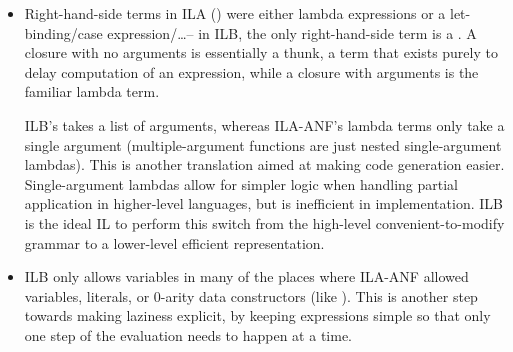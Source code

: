 \documentclass[dissertation.tex]{subfiles}
\begin{document}
{{{\begin{itemize}
{                 also requires all its arguments to be present: it cannot be a partial application.
                Haskell treats datatype constructors as functions, so the following is a valid program:

                \begin{haskellfigure}
                data Pair a b = Pair a b
                x = Pair 1
                y = x 2
                \end{haskellfigure}

                At the implementation level however, functions and data constructors are necessarily very different, so
                distinguishing them within this IL makes code generation easier.


            }
            \item
            {

                Right-hand-side terms in ILA () were either lambda expressions or a let-binding/case
                expression/\dots -- in ILB, the only right-hand-side term is a . A closure with no
                arguments is essentially a thunk, a term that exists purely to delay computation of an expression, while
                a closure with arguments is the familiar lambda term.

                ILB's  takes a list of arguments, whereas ILA-ANF's lambda terms only take a single
                argument (multiple-argument functions are just nested single-argument lambdas). This is another
                translation aimed at making code generation easier. Single-argument lambdas allow for simpler logic when
                handling partial application in higher-level languages, but is inefficient in implementation. ILB is the
                ideal IL to perform this switch from the high-level convenient-to-modify grammar to a lower-level
                efficient representation.

            }
            \item
            {

                ILB only allows variables in many of the places where ILA-ANF allowed variables, literals, or 0-arity
                data constructors (like ). This is another step towards making laziness explicit, by
                keeping expressions simple so that only one step of the evaluation needs to happen at a time.

}
\end{itemize}}}}
\end{document}
